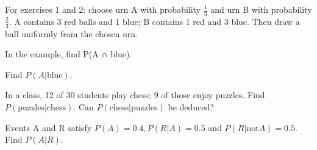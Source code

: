 \documentclass[11pt]{article}
\begin{document}
For exercises 1 and 2: choose urn A with probability \(\frac{1}{3}\) and urn B with probability \(\frac{2}{3}\). A contains 3 red balls and 1 blue; B contains 1 red and 3 blue. Then draw a ball uniformly from the chosen urn.\par
\vspace{5pt}
In the example, find P(A ∩ blue).\par
\vspace{5pt}
Find \(P(A|\mathrm{blue})\).\par
\vspace{5pt}
In a class, 12 of 30 students play chess; 9 of those enjoy puzzles. Find \(P(\mathrm{puzzles}|\mathrm{chess})\). Can \(P(\mathrm{chess}|\mathrm{puzzles})\) be deduced?\par
\vspace{5pt}
Events A and R satisfy \(P(A)=0.4, P(R|A)=0.5\) and \(P(R|\mathrm{not} A)=0.5\). Find \(P(A|R)\).\par
\vspace{5pt}
\end{document}
